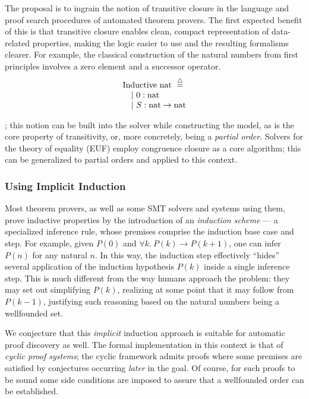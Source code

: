 The proposal is to ingrain the notion of transitive closure in the language and proof search procedures of automated theorem provers.
The first expected benefit of this is that transitive closure enables clean, compact representation of data-related properties,
making the logic easier to use and the resulting formalisms clearer.
For example, the classical construction of the natural numbers from first principles involves a zero element and a successor operator.
\[
\begin{array}{ll}
\textrm{Inductive}~\mathrm{nat}~\overset{\triangle}{=} \\
\quad |~0 : \mathrm{nat} \\
\quad |~S : \mathrm{nat} \to\mathrm{nat}
\end{array}
\]

; this notion can be built into the solver
while constructing the model, as is the core property of transitivity, or,
more concretely, being a \emph{partial order}.
Solvers for the theory of equality (EUF) employ congruence closure as a core
algorithm; this can be generalized to partial orders and applied to this
context.


\subsubsection{Using Implicit Induction}

Most theorem provers, as well as some SMT solvers and systems using them,
prove inductive properties by the introduction of an \emph{induction scheme} ---
a specialized inference rule, whose premises comprise the induction base case
and step.
For example, given $P(0)$ and $\forall k.~ P(k)\rightarrow P(k+1)$,
one can infer $P(n)$ for any natural $n$.
In this way, the induction step effectively ``hides'' several application of
the induction hypothesis $P(k)$ inside a single inference step.
This is much different from the way humans approach the problem: they may set
out simplifying $P(k)$, realizing at some point that it may follow from $P(k-1)$,
justifying such reasoning based on the natural numbers being a wellfounded set.

We conjecture that this \emph{implicit} induction approach is suitable for
automatic proof discovery as well.
The formal implementation in this context is that of \emph{cyclic proof systems};
the cyclic framework admits proofs where some premises are satisfied by
conjectures occurring \emph{later} in the goal.
Of course, for such proofs to be sound some side conditions are imposed to assure
that a wellfounded order can be established.


